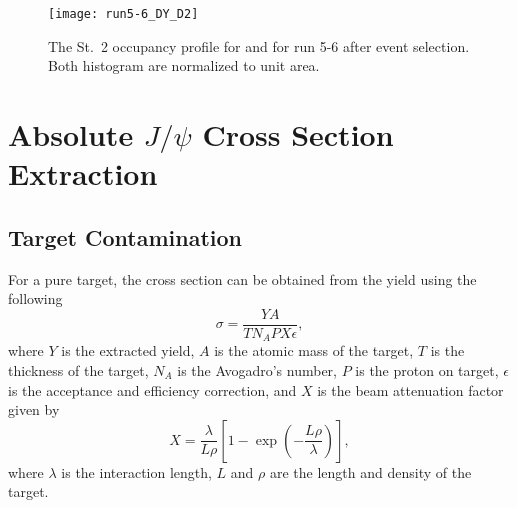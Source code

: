 \documentclass[../main.tex]{subfiles}
\begin{document}
\begin{figure}[h!]
	\centering
	\texttt{[image: run5-6\_DY\_D2]}
	\caption{The St.~2 occupancy profile for  and  for run 5-6 after event selection. Both histogram are normalized to unit area.
	}
	\label{fig:target_D2}
\end{figure}

\section{Absolute \texorpdfstring{$J/\psi$}{J/psi} Cross Section Extraction}
\subsection{Target Contamination}
For a pure target, the cross section can be obtained from the yield using the following
\begin{equation}
	\sigma = \frac{Y A}{T N_A P X \epsilon},
\end{equation}
where $Y$ is the extracted yield, $A$ is the atomic mass of the target,
$T$ is the thickness of the target, $N_A$ is the Avogadro’s number,
$P$ is the proton on target, $\epsilon$ is the acceptance and efficiency correction,
and $X$ is the beam attenuation factor given by
\begin{equation}
	X=\frac{\lambda}{L\rho} \left[1-\exp\left(-\frac{L\rho}{\lambda}\right)\right],
\end{equation}
where $\lambda$ is the interaction length, $L$ and $\rho$ are the length and density
of the target.
\end{document}
